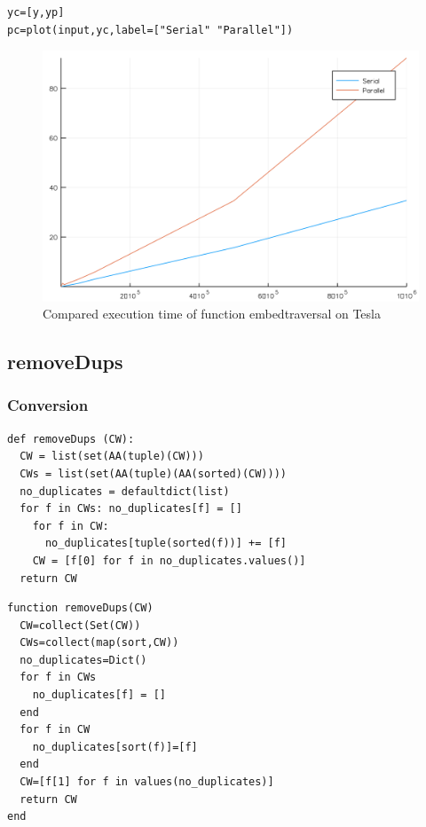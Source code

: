 \documentclass[a4paper,12pt]{article}
\begin{document}
\noindent {}
\begin{Verbatim}[fontsize=\footnotesize]
yc=[y,yp]
pc=plot(input,yc,label=["Serial" "Parallel"])
\end{Verbatim}
\begin{figure}[!h]
\centering
\includegraphics[scale=0.08]{compembedStruct.png}
\caption{Compared execution time of function embedtraversal on Tesla}
\end{figure}

\newpage

\subsection{removeDups}
\subsubsection{Conversion}
\begin{Verbatim}[fontsize=\footnotesize]
def removeDups (CW):
  CW = list(set(AA(tuple)(CW)))
  CWs = list(set(AA(tuple)(AA(sorted)(CW))))
  no_duplicates = defaultdict(list)
  for f in CWs: no_duplicates[f] = []
    for f in CW:
      no_duplicates[tuple(sorted(f))] += [f]
    CW = [f[0] for f in no_duplicates.values()]
  return CW
\end{Verbatim}
\begin{Verbatim}[fontsize=\footnotesize]
function removeDups(CW)
  CW=collect(Set(CW))
  CWs=collect(map(sort,CW))
  no_duplicates=Dict()
  for f in CWs
    no_duplicates[f] = []
  end
  for f in CW
    no_duplicates[sort(f)]=[f]
  end
  CW=[f[1] for f in values(no_duplicates)]
  return CW
end 
\end{Verbatim}
\end{document}
